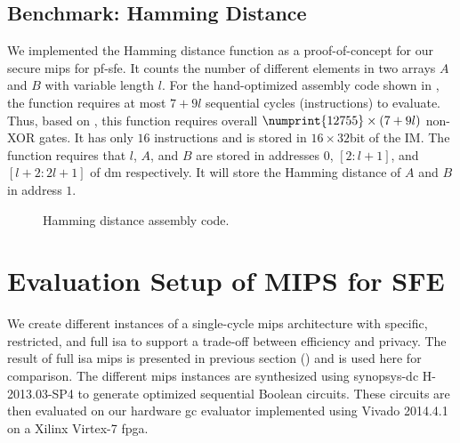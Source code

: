 \subsection{Benchmark: Hamming Distance}
We implemented the Hamming distance function as a proof-of-concept for our secure \gls{mips} for \acrshort{pf-sfe}.
It counts the number of different elements in two arrays $A$ and $B$ with variable length $l$.
For the hand-optimized assembly code shown in , the function requires at most $7+9l$ sequential cycles (instructions) to evaluate.
Thus, based on , this function requires overall $\numprint{12755}\times(7+9l)$ non-XOR gates.
It has only $16$ instructions and is stored in $16\times32$bit of the IM.
The function requires that $l$, $A$, and $B$ are stored in addresses $0$, $[2:l+1]$, and $[l+2:2l+1]$ of \acrshort{dm} respectively.
It will store the Hamming distance of $A$ and $B$ in address $1$.



\begin{figure}[ht]
\centering
\resizebox{!}{0.45\textheight}{%

}
\caption{Hamming distance assembly code.}\label{figure:hamminassembly}
\end{figure}

\section{Evaluation Setup of MIPS for SFE} \label{sec:eval-mips-sfe}
We create different instances of a single-cycle \gls{mips} architecture with specific, restricted, and full \acrshort{isa} to support a trade-off between efficiency and privacy.
The result of full \acrshort{isa} \gls{mips} is presented in previous section () and is used here for comparison.
The different \gls{mips} instances are synthesized using \gls{synopsys-dc} H-2013.03-SP4 to generate optimized sequential Boolean circuits.
These circuits are then evaluated on our hardware \acrshort{gc} evaluator implemented using Vivado 2014.4.1 on a Xilinx Virtex-7 \acrshort{fpga}.

